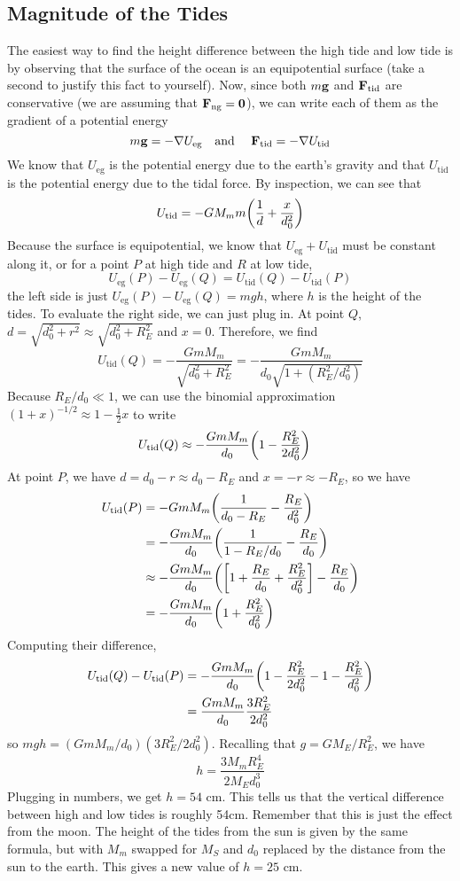 \subsection*{Magnitude of the Tides}
The easiest way to find the height difference between the high tide and low tide is by observing that the surface of the ocean is an equipotential surface (take a second to justify this fact to yourself). Now, since both $m\mathbf{g}$ and $\mathbf{F}_\text{tid}$ are conservative (we are assuming that $\mathbf{F}_\text{ng} = \mathbf{0}$), we can write each of them as the gradient of a potential energy
\[ m\mathbf{g} = -\nabla U_\text{eg} \quad\text{and}\quad\ \mathbf{F}_\text{tid} = -\nabla U_\text{tid} \]
We know that $U_\text{eg}$ is the potential energy due to the earth's gravity and that $U_\text{tid}$ is the potential energy due to the tidal force. By inspection, we can see that
\[ U_\text{tid} = -GM_mm\pqty{\frac{1}{d} + \frac{x}{d_0^2}} \]
Because the surface is equipotential, we know that $U_\text{eg} + U_\text{tid}$ must be constant along it, or for a point $P$ at high tide and $R$ at low tide,
\[ U_\text{eg}(P) - U_\text{eg}(Q) = U_\text{tid}(Q) - U_\text{tid}(P)\]
the left side is just $U_\text{eg}(P) - U_\text{eg}(Q) = mgh$, where $h$ is the height of the tides. To evaluate the right side, we can just plug in. At point $Q$, $d = \sqrt{d_0^2+r^2} \approx \sqrt{d_0^2+R_E^2}$ and $x=0$. Therefore, we find
\[ U_\text{tid}(Q) = -\frac{GmM_m}{\sqrt{d_0^2+R_E^2}} = -\frac{GmM_m}{d_0\sqrt{1+(R_E^2/d_0^2)}}\]
Because $R_E/d_0 \ll 1$, we can use the binomial approximation $(1+x)^{-1/2} \approx 1-\frac{1}{2}x$ to write
\begin{align*}
    U_\text{tid}(Q) &\approx -\frac{GmM_m}{d_0}\pqty{1-\frac{R_E^2}{2d_0^2}} 
\end{align*}
At point $P$, we have $d = d_0-r \approx d_0-R_E$ and $x=-r \approx -R_E$, so we have
\begin{align*}
    U_\text{tid}(P) &= -GmM_m \pqty{\frac{1}{d_0-R_E} - \frac{R_E}{d_0^2}} \\
    &= -\frac{GmM_m}{d_0}\pqty{\frac{1}{1-R_E/d_0} - \frac{R_E}{d_0}} \\
    &\approx -\frac{GmM_m}{d_0}\pqty{\bqty{1+\frac{R_E}{d_0} + \frac{R_E^2}{d_0^2}}-\frac{R_E}{d_0}} \\
    &= -\frac{GmM_m}{d_0}\pqty{1+\frac{R_E^2}{d_0^2}}
\end{align*}
Computing their difference,
\begin{align*}
    U_\text{tid}(Q)-U_\text{tid}(P) &= -\frac{GmM_m}{d_0}\pqty{1-\frac{R_E^2}{2d_0^2}-1-\frac{R_E^2}{d_0^2}} \\
    &= \frac{GmM_m}{d_0}\frac{3R_E^2}{2d_0^2}
\end{align*}
so $mgh = (GmM_m/d_0)(3R_E^2/2d_0^2)$. Recalling that $g = GM_E/R_E^2$, we have
\[ h = \frac{3M_mR_E^4}{2M_Ed_0^3}\]
Plugging in numbers, we get $h = 54$ cm. This tells us that the vertical difference between high and low tides is roughly 54cm. Remember that this is just the effect from the moon. The height of the tides from the sun is given by the same formula, but with $M_m$ swapped for $M_S$ and $d_0$ replaced by the distance from the sun to the earth. This gives a new value of $h=25$ cm. 

